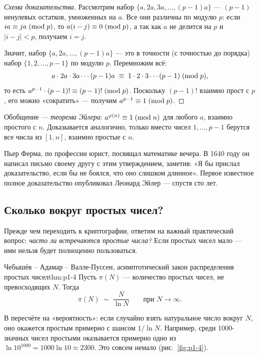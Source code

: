 \begin{proof}[Схема доказательства]
Рассмотрим набор $\{a, 2a, 3a, \ldots, (p-1)a\}$ --- $(p-1)$ ненулевых остатков, умноженных на $a$. Все они различны по модулю $p$: если $ia \equiv ja \;(\mathrm{mod}\;p)$, то $a(i-j) \equiv 0 \;(\mathrm{mod}\;p)$, а так как $a$ не делится на $p$ и $|i-j| < p$, получаем $i = j$.

Значит, набор $\{a, 2a, \ldots, (p-1)a\}$ --- это в точности (с точностью до порядка) набор $\{1, 2, \ldots, p-1\}$ по модулю $p$. Перемножим всё:
\[
a\cdot 2a\cdot 3a \cdots (p-1)a \;\equiv\; 1\cdot 2\cdot 3\cdots(p-1) \;(\mathrm{mod}\;p),
\]
то есть $a^{p-1}\cdot (p-1)! \equiv (p-1)! \;(\mathrm{mod}\;p)$. Поскольку $(p-1)!$ взаимно прост с $p$, его можно «сократить» --- получим $a^{p-1} \equiv 1 \;(\mathrm{mod}\;p)$. \qedhere
\end{proof}

Обобщение --- \emph{теорема Эйлера}: $a^{\varphi(n)} \equiv 1 \;(\mathrm{mod}\;n)$ для любого $a$, взаимно простого с $n$. Доказывается аналогично, только вместо чисел $1, \ldots, p-1$ берутся все числа из $[1,n]$, взаимно простые с $n$.

\begin{interestbox}
Пьер Ферма, по профессии юрист, посвящал математике вечера. В 1640 году он написал письмо своему другу с этим утверждением, заметив: «Я бы прислал доказательство, если бы не боялся, что оно слишком длинное». Первое известное полное доказательство опубликовал Леонард Эйлер --- спустя сто лет.
\end{interestbox}

\subsection{Сколько вокруг простых чисел?}

Прежде чем переходить к криптографии, ответим на важный практический вопрос: \emph{часто ли встречаются простые числа?} Если простых чисел мало --- ими нельзя будет полноценно пользоваться.

\begin{theorem}{Чебышёв -- Адамар -- Валле-Пуссен, асимптотический закон распределения простых чисел}{thm:p1-4}
Пусть $\pi(N)$ --- количество простых чисел, не превосходящих $N$. Тогда
\[
\pi(N) \;\sim\; \frac{N}{\ln N} \qquad \text{при } N \to \infty.
\]
\end{theorem}

\noindent
В пересчёте на «вероятность»: если случайно взять натуральное число вокруг $N$, оно окажется простым примерно с шансом $1/\ln N$. Например, среди 1000-значных чисел простыми оказывается примерно одно из $\ln 10^{1000} = 1000\ln 10 \approx 2300$. Это совсем немало (рис.~\ref{fig:p1-4}).


